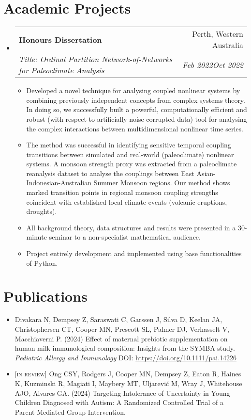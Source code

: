 \documentclass[letterpaper,10.8pt]{article}
\makeatletter
\newcommand{\resumeItem}[2]{
  \item\small{
    \textbf{#1}{#2 \vspace{-2pt}}
  }
}
\newcommand{\resumeSubheading}[4]{
  \vspace{-1pt}\item
    \begin{tabular*}{0.97\textwidth}{l@{\extracolsep{\fill}}r}
      \textbf{#1} & #2 \\
      \textit{\small#3} & \textit{\small #4} \\
    \end{tabular*}\vspace{-5pt}
}
\newcommand{\resumeSubHeadingListStart}{\begin{itemize}[leftmargin=*]}
\newcommand{\resumeSubHeadingListEnd}{\end{itemize}}
\newcommand{\resumeItemListStart}{\begin{itemize}}
\newcommand{\resumeItemListEnd}{\end{itemize}\vspace{-5pt}}
\makeatother
\begin{document}
\section{Academic Projects}
\resumeSubHeadingListStart
\resumeSubheading
    {Honours Dissertation}{Perth, Western Australia}
    {Title: Ordinal Partition Network-of-Networks for Paleoclimate Analysis}{Feb 2022\textendash Oct 2022}
    \resumeItemListStart
    \resumeItem{}{Developed a novel technique for analysing coupled nonlinear systems by combining previously independent concepts from complex systems theory. In doing so, we successfully built a powerful, computationally efficient and robust (with respect to artificially noise-corrupted data) tool for analysing the complex interactions between multidimensional nonlinear time series.}
    \resumeItem{}{The method was successful in identifying sensitive temporal coupling transitions between simulated and real-world (paleoclimate) nonlinear systems. A monsoon strength proxy was extracted from a paleoclimate reanalysis dataset to analyse the couplings between East Asian-Indonesian-Australian Summer Monsoon regions. Our method shows marked transition points in regional monsoon coupling strengths coincident with established local climate events (volcanic eruptions, droughts).}
    \resumeItem{}{All background theory, data structures and results were presented in a 30-minute seminar to a non-specialist mathematical audience.}
    \resumeItem{}{Project entirely development and implemented using base functionalities of Python.}
    \resumeItemListEnd
\resumeSubHeadingListEnd

\section{Publications}
\begin{itemize}
    \item Divakara N, Dempsey Z, Saraswati C, Garssen J, Silva D, Keelan JA, Christophersen CT, Cooper MN, Prescott SL, Palmer DJ, Verhasselt V, Macchiaverni P. (2024) Effect of maternal prebiotic supplementation on human milk immunological composition: Insights from the SYMBA study. \textit{Pediatric Allergy and Immunology} DOI: \url{https://doi.org/10.1111/pai.14226}
    \item \textsc{[in review]} Ong CSY, Rodgers J, Cooper MN, Dempsey Z, Eaton R, Haines K, Kuzminski R, Magiati I, Maybery MT, Uljarević M, Wray J, Whitehouse AJO, Alvares GA. (2024) Targeting Intolerance of Uncertainty in Young Children Diagnosed with Autism: A Randomized Controlled Trial of a Parent-Mediated Group Intervention.
\end{itemize}
\end{document}
